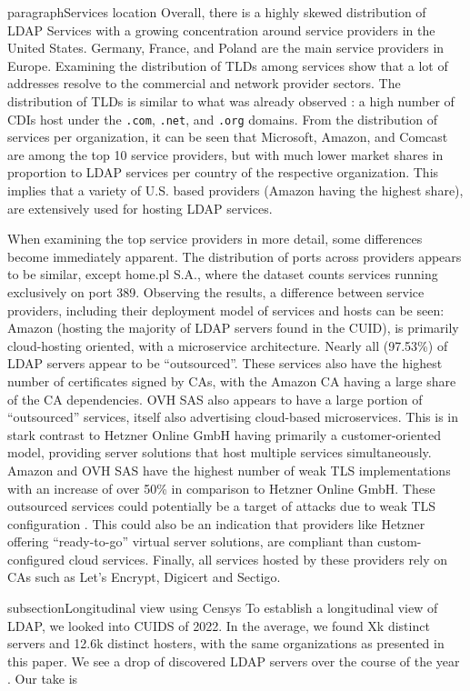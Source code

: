 paragraph{Services location}
Overall, there is a highly skewed distribution of LDAP Services with a growing concentration around service providers in the United States. Germany, France, and Poland are the main service providers in Europe. Examining the distribution of TLDs among services show that a lot of addresses resolve to the commercial and network provider sectors. The distribution of TLDs is similar to what was already observed \cite{doan2022}: a high number of CDIs host under the \verb|.com|, \verb|.net|, and \verb|.org| domains. From the distribution of services per organization, it can be seen that Microsoft, Amazon, and Comcast are among the top 10 service providers, but with much lower market shares in proportion to LDAP services per country of the respective organization. This implies that a variety of U.S. based providers (Amazon having the highest share), are extensively used for hosting LDAP services.  

When examining the top service providers in more detail, some differences become immediately apparent. The distribution of ports across providers appears to be similar, except home.pl S.A., where the dataset counts services running exclusively on port 389. Observing the results, a difference between service providers, including their deployment model of services and hosts can be seen: Amazon (hosting the majority of LDAP servers found in the CUID), is primarily cloud-hosting oriented, with a microservice architecture. Nearly all (97.53\%) of LDAP servers appear to be ``outsourced''. These services also have the highest number of certificates signed by CAs, with the Amazon CA having a large share of the CA dependencies.  OVH SAS also appears to have a large portion of ``outsourced'' services, itself also advertising cloud-based microservices. This is in stark contrast to Hetzner Online GmbH having primarily a customer-oriented model, providing server solutions that host multiple services simultaneously.  Amazon and OVH SAS have the highest number of weak TLS implementations with an increase of over 50\% in comparison to Hetzner Online GmbH. These outsourced services could potentially be a target of attacks due to weak TLS configuration \cite{fardan2013}. This could also be an indication that providers like Hetzner offering ``ready-to-go'' virtual server solutions, are compliant than custom-configured cloud services. Finally, all services hosted by these providers rely on CAs such as Let's Encrypt, Digicert and Sectigo.
\fi

\iffalse
subsection{Longitudinal view using Censys}
To establish a longitudinal view of \gls{LDAP}, we looked into \gls{CUIDS} of 2022. In the average, we found Xk distinct servers  and 12.6k distinct hosters, with the same organizations as presented in this paper. We see a drop of discovered \gls{LDAP} servers over the course of the year . Our take is 

